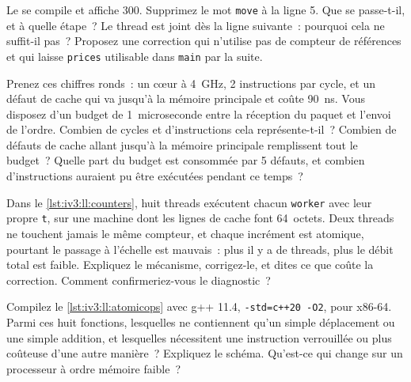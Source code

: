 \begin{question}\label{iq:iv3:low-latency:4}
Le  se compile et affiche 300. Supprimez le mot \texttt{move} à la ligne 5. Que se passe-t-il, et à quelle étape~? Le thread est joint dès la ligne suivante~: pourquoi cela ne suffit-il pas~? Proposez une correction qui n'utilise pas de compteur de références et qui laisse \texttt{prices} utilisable dans \texttt{main} par la suite.
\label{lst:iv3:ll:spawn}
\end{question}

\begin{question}\label{iq:iv3:low-latency:5}
Prenez ces chiffres ronds~: un cœur à 4~GHz, 2 instructions par cycle, et un défaut de cache qui va jusqu'à la mémoire principale et coûte 90~ns. Vous disposez d'un budget de 1~microseconde entre la réception du paquet et l'envoi de l'ordre. Combien de cycles et d'instructions cela représente-t-il~? Combien de défauts de cache allant jusqu'à la mémoire principale remplissent tout le budget~? Quelle part du budget est consommée par 5 défauts, et combien d'instructions auraient pu être exécutées pendant ce temps~?
\end{question}

\begin{question}\label{iq:iv3:low-latency:6}
Dans le \cref{lst:iv3:ll:counters}, huit threads exécutent chacun \texttt{worker} avec leur propre \texttt{t}, sur une machine dont les lignes de cache font 64~octets. Deux threads ne touchent jamais le même compteur, et chaque incrément est atomique, pourtant le passage à l'échelle est mauvais~: plus il y a de threads, plus le débit total est faible. Expliquez le mécanisme, corrigez-le, et dites ce que coûte la correction. Comment confirmeriez-vous le diagnostic~?
\label{lst:iv3:ll:counters}
\end{question}

\begin{question}\label{iq:iv3:low-latency:7}
Compilez le \cref{lst:iv3:ll:atomicops} avec g++ 11.4, \texttt{-std=c++20 -O2}, pour x86-64. Parmi ces huit fonctions, lesquelles ne contiennent qu'un simple déplacement ou une simple addition, et lesquelles nécessitent une instruction verrouillée ou plus coûteuse d'une autre manière~? Expliquez le schéma. Qu'est-ce qui change sur un processeur à ordre mémoire faible~?
\label{lst:iv3:ll:atomicops}
\end{question}

